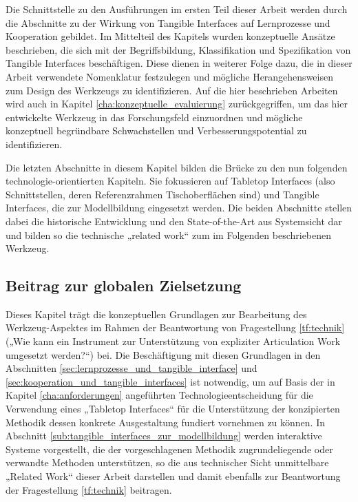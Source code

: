 Die Schnittstelle zu den Ausführungen im ersten Teil dieser Arbeit werden durch die Abschnitte zu der Wirkung von Tangible Interfaces auf Lernprozesse und Kooperation gebildet. Im Mittelteil des Kapitels wurden konzeptuelle Ansätze beschrieben, die sich mit der Begriffsbildung, Klassifikation und Spezifikation von Tangible Interfaces beschäftigen. Diese dienen in weiterer Folge dazu, die in dieser Arbeit verwendete Nomenklatur festzulegen und mögliche Herangehensweisen zum Design des Werkzeugs zu identifizieren. Auf die hier beschrieben Arbeiten wird auch in Kapitel \ref{cha:konzeptuelle_evaluierung} zurückgegriffen, um das hier entwickelte Werkzeug in das Forschungsfeld einzuordnen und mögliche konzeptuell begründbare Schwachstellen und Verbesserungspotential zu identifizieren.

Die letzten Abschnitte in diesem Kapitel bilden die Brücke zu den nun folgenden technologie-orientierten Kapiteln. Sie fokussieren auf Tabletop Interfaces (also Schnittstellen, deren Referenzrahmen Tischoberflächen sind) und Tangible Interfaces, die zur Modellbildung eingesetzt werden. Die beiden Abschnitte stellen dabei die historische Entwicklung und den State-of-the-Art aus Systemsicht dar und bilden so die technische „related work“ zum im Folgenden beschriebenen Werkzeug. 

\subsection{Beitrag zur globalen Zielsetzung}

Dieses Kapitel trägt die konzeptuellen Grundlagen zur Bearbeitung des Werkzeug-Aspektes im Rahmen der Beantwortung von Fragestellung \ref{tf:technik} („Wie kann ein Instrument zur Unterstützung von expliziter Articulation Work umgesetzt werden?“) bei. Die Beschäftigung mit diesen Grundlagen in den Abschnitten \ref{sec:lernprozesse_und_tangible_interface} und \ref{sec:kooperation_und_tangible_interfaces} ist notwendig, um auf Basis der in Kapitel \ref{cha:anforderungen} angeführten Technologieentscheidung für die Verwendung eines „Tabletop Interfaces“ für die Unterstützung der konzipierten Methodik dessen konkrete Ausgestaltung fundiert vornehmen zu können. In Abschnitt \ref{sub:tangible_interfaces_zur_modellbildung} werden interaktive Systeme vorgestellt, die der vorgeschlagenen Methodik zugrundeliegende oder verwandte Methoden unterstützen, so die aus technischer Sicht unmittelbare „Related Work“ dieser Arbeit darstellen und damit ebenfalls zur Beantwortung der Fragestellung \ref{tf:technik} beitragen.

